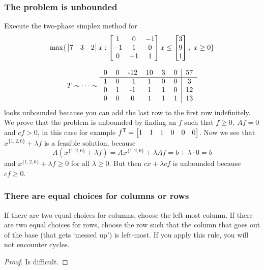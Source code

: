 \documentclass{exam}
\begin{document}
    \subsubsection{The problem is unbounded}
    \begin{question}
        Execute the two-phase simplex method for
        \[
            \max \{ \matrix{7 & 3 & 2} x : \matrix{1 & 0 & -1 \\ -1 & 1 & 0 \\ 0 & -1 & 1} x \le \matrix{3 \\ 9  \\ 1},\ x \ge 0 \}
        \]
    \end{question}
    \begin{answer}
        \[
            T \sim \dots \sim
            \begin{tabular}{cccccc|c}
                0 & 0 & -12 & 10 & 3 & 0 & 57 \\ \hline
                1 & 0 & -1 & 1 & 0 & 0 & 3 \\
                0 & 1 & -1 & 1 & 1 & 0 & 12 \\
                0 & 0 & 0 & 1 & 1 & 1 & 13 \\
            \end{tabular}
        \]
        looks unbounded because you can add the last row to the first row indefinitely.
        We prove that the problem is unbounded by finding an $f$ such that $f \ge 0,\ Af=0$ and $cf >0$, in this case for example $f^\t = \matrix{1 & 1 & 1 & 0 & 0 & 0}$.
        Now we see that $x^{\{1,2,6\}} + \lambda f$ is a feasible solution, because
        \[
            A (x^{\{1,2,6\}} + \lambda f) = A x^{\{1,2,6\}} + \lambda A f = b + \lambda \cdot 0 = b
        \]
        and $x^{\{1,2,6\}} + \lambda f \ge 0$ for all $\lambda \ge 0$.
        But then $cx + \lambda cf$ is unbounded because $cf \ge 0$.
    \end{answer}

    \subsubsection{There are equal choices for columns or rows}
    \begin{theorem}
        If there are two equal choices for columns, choose the left-most column.
        If there are two equal choices for rows, choose the row such that the column that goes out of the base (that gets `messed up') is left-most.
        If you apply this rule, you will not encounter cycles.
    \end{theorem}
    \begin{proof}
        Is difficult. %
    \end{proof}
\end{document}
